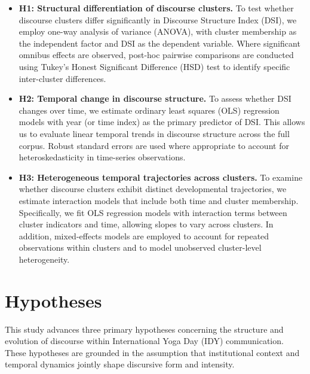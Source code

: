 \documentclass[11pt]{article}
\begin{document}
\begin{itemize}

\item \textbf{H1: Structural differentiation of discourse clusters.}  
To test whether discourse clusters differ significantly in Discourse Structure Index (DSI), we employ one-way analysis of variance (ANOVA), with cluster membership as the independent factor and DSI as the dependent variable. Where significant omnibus effects are observed, post-hoc pairwise comparisons are conducted using Tukey’s Honest Significant Difference (HSD) test to identify specific inter-cluster differences.

\item \textbf{H2: Temporal change in discourse structure.}  
To assess whether DSI changes over time, we estimate ordinary least squares (OLS) regression models with year (or time index) as the primary predictor of DSI. This allows us to evaluate linear temporal trends in discourse structure across the full corpus. Robust standard errors are used where appropriate to account for heteroskedasticity in time-series observations.

\item \textbf{H3: Heterogeneous temporal trajectories across clusters.}  
To examine whether discourse clusters exhibit distinct developmental trajectories, we estimate interaction models that include both time and cluster membership. Specifically, we fit OLS regression models with interaction terms between cluster indicators and time, allowing slopes to vary across clusters. In addition, mixed-effects models are employed to account for repeated observations within clusters and to model unobserved cluster-level heterogeneity.

\end{itemize}


\section{Hypotheses}

This study advances three primary hypotheses concerning the structure and evolution of discourse within International Yoga Day (IDY) communication. These hypotheses are grounded in the assumption that institutional context and temporal dynamics jointly shape discursive form and intensity.
\end{document}
